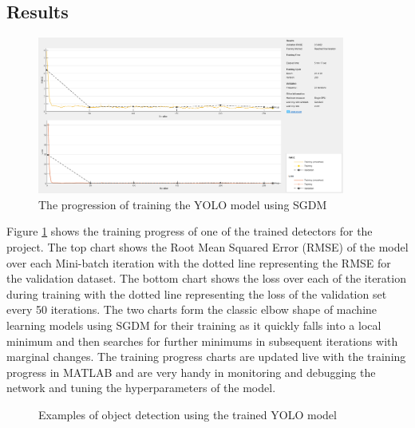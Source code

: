 \subsection{Results}

\begin{figure}[H]
\centering
\includegraphics[width=0.9\textwidth]{figures/YOLOv3-training-2-weights-conv30.PNG}
\caption{The progression of training the YOLO model using SGDM}
\label{fig:yolo-training}
\end{figure}

Figure \ref{fig:yolo-training} shows the training progress of one of the trained detectors for the project. The top chart shows the Root Mean Squared Error (RMSE) of the model over each Mini-batch iteration with the dotted line representing the RMSE for the validation dataset. The bottom chart shows the loss over each of the iteration during training with the dotted line representing the loss of the validation set every 50 iterations. The two charts form the classic elbow shape of machine learning models using SGDM for their training as it quickly falls into a local minimum and then searches for further minimums in subsequent iterations with marginal changes. The training progress charts are updated live with the training progress in MATLAB and are very handy in monitoring and debugging the network and tuning the hyperparameters of the model.

\begin{figure}[H]
    \caption{Examples of object detection using the trained YOLO model}
    \label{fig:yolo}
\end{figure}

